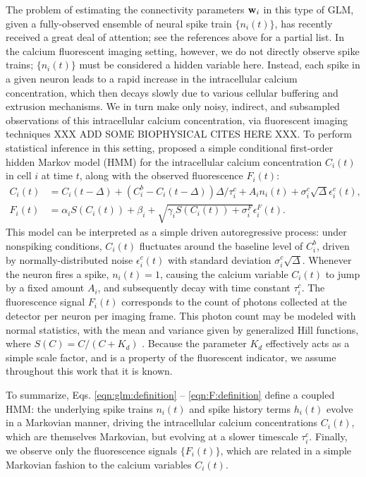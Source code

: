 The problem of estimating the connectivity parameters $\mathbf{w}_i$ in this type of GLM, given a fully-observed ensemble of neural spike train $\{n_i(t)\}$, has recently received a great deal of attention; see the references above for a partial list. In the calcium fluorescent imaging setting, however, we do not directly observe spike trains; $\{n_i(t)\}$ must be considered a hidden variable here. Instead, each spike in a given neuron leads to a rapid increase in the intracellular calcium concentration, which then decays slowly due to various cellular buffering and extrusion mechanisms. We in turn make only noisy, indirect, and subsampled observations of this intracellular calcium concentration, via fluorescent imaging techniques XXX ADD SOME BIOPHYSICAL CITES HERE XXX. To perform statistical inference in this setting, \cite{Vogelstein2009} proposed a simple conditional first-order hidden Markov model (HMM) for the intracellular calcium concentration $C_i(t)$ in cell $i$ at time $t$, along with the observed fluorescence $F_i(t)$: \begin{align} \label{eqn:ca:definition} C_i(t) &= C_i(t-\Delta) + (C_i^b-C_i(t-\Delta)) \Delta/\tau^c_i + A_i n_i(t)+\sigma^c_i \sqrt{\Delta} \epsilon^c_i(t), \\ F_i(t) &= \alpha_i S(C_i(t)) + \beta_i + \sqrt{\gamma_i S(C_i(t)) + \sigma^F_i} \epsilon^F_i(t). \label{eqn:F:definition} \end{align} This model can be interpreted as a simple driven autoregressive process: under nonspiking conditions, $C_i(t)$ fluctuates around the baseline level of $C_i^b$, driven by normally-distributed noise $\epsilon^c_i(t)$ with standard deviation $\sigma^c_i \sqrt{\Delta}$. Whenever the neuron fires a spike, $n_i(t)=1$, causing the calcium variable $C_i(t)$ to jump by a fixed amount $A_i$, and subsequently decay with time constant $\tau^c_i$. The fluorescence signal $F_i(t)$ corresponds to the count of photons collected at the detector per neuron per imaging frame. This photon count may be modeled with normal statistics, with the mean and variance given by generalized Hill functions, where $S(C)=C/(C+K_d)$ \cite{Yasuda2004}. Because the parameter $K_d$ effectively acts as a simple scale factor, and is a property of the fluorescent indicator, we assume throughout this work that it is known.

To summarize, Eqs. \ref{eqn:glm:definition} -- \ref{eqn:F:definition} define a coupled HMM: the underlying spike trains $n_i(t)$ and spike history terms $h_i(t)$ evolve in a Markovian manner, driving the intracellular calcium concentrations $C_i(t)$, which are themselves Markovian, but evolving at a slower timescale $\tau_i^c$. Finally, we observe only the fluorescence signals $\{F_i(t)\}$, which are related in a simple Markovian fashion to the calcium variables $C_i(t)$.


